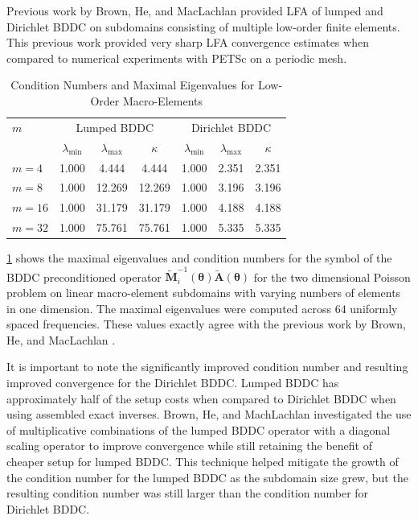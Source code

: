\documentclass[review]{siamart190516}
\begin{document}
Previous work by Brown, He, and MacLachlan \cite{brown2019local} provided LFA of lumped and Dirichlet BDDC on subdomains consisting of multiple low-order finite elements.
This previous work provided very sharp LFA convergence estimates when compared to numerical experiments with PETSc \cite{petsc-user-ref} on a periodic mesh.

\begin{table}[ht!]
\begin{center}
\begin{tabular}{l ccc ccc}
  \toprule
  $m$  &  \multicolumn{3}{c}{Lumped BDDC}  &  \multicolumn{3}{c}{Dirichlet BDDC}  \\
                      &  $\lambda_{\min}$  &  $\lambda_{\max}$  &  $\kappa$ & $\lambda_{\min}$  &  $\lambda_{\max}$ & $\kappa$  \\
  \toprule
  $m = 4$   &  1.000  &   4.444  &   4.444  &  1.000  &  2.351  &  2.351  \\
  $m = 8$   &  1.000  &  12.269  &  12.269  &  1.000  &  3.196  &  3.196  \\
  $m = 16$  &  1.000  &  31.179  &  31.179  &  1.000  &  4.188  &  4.188  \\
  $m = 32$  &  1.000  &  75.761  &  75.761  &  1.000  &  5.335  &  5.335  \\
  \bottomrule
\end{tabular}
\end{center}
\caption{Condition Numbers and Maximal Eigenvalues for Low-Order Macro-Elements}
\label{table:macro_element_bddc}
\end{table}

\cref{table:macro_element_bddc} shows the maximal eigenvalues and condition numbers for the symbol of the BDDC preconditioned operator $\tilde{\mathbf{M}}^{-1}_i \left( \boldsymbol{\theta} \right) \tilde{\mathbf{A}} \left( \boldsymbol{\theta} \right)$ for the two dimensional Poisson problem on linear macro-element subdomains with varying numbers of elements in one dimension.
The maximal eigenvalues were computed across $64$ uniformly spaced frequencies.
These values exactly agree with the previous work by Brown, He, and MacLachlan \cite{brown2019local}.

It is important to note the significantly improved condition number and resulting improved convergence for the Dirichlet BDDC.
Lumped BDDC has approximately half of the setup costs when compared to Dirichlet BDDC when using assembled exact inverses.
Brown, He, and MachLachlan investigated the use of multiplicative combinations of the lumped BDDC operator with a diagonal scaling operator to improve convergence while still retaining the benefit of cheaper setup for lumped BDDC.
This technique helped mitigate the growth of the condition number for the lumped BDDC as the subdomain size grew, but the resulting condition number was still larger than the condition number for Dirichlet BDDC.
\end{document}
